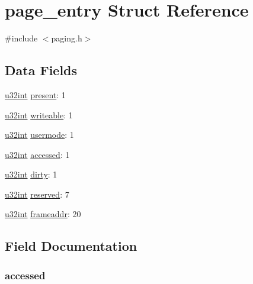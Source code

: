 \hypertarget{structpage__entry}{}\section{page\+\_\+entry Struct Reference}
\label{structpage__entry}


{\ttfamily \#include $<$paging.\+h$>$}

\subsection*{Data Fields}
\begin{DoxyCompactItemize}
\item 
\hyperlink{system_8h_a757de76cafbcddaac0d1632902fe4cb8}{u32int} \hyperlink{structpage__entry_a69718d61bbe7faf204d90744c9824c52}{present}\+: 1
\item 
\hyperlink{system_8h_a757de76cafbcddaac0d1632902fe4cb8}{u32int} \hyperlink{structpage__entry_a421725c39c0745b022f36ab85b6cf3ce}{writeable}\+: 1
\item 
\hyperlink{system_8h_a757de76cafbcddaac0d1632902fe4cb8}{u32int} \hyperlink{structpage__entry_a277f6a1db251178ac4c5bd2e58acf139}{usermode}\+: 1
\item 
\hyperlink{system_8h_a757de76cafbcddaac0d1632902fe4cb8}{u32int} \hyperlink{structpage__entry_afb99a0327fa4c7332208a4c69586c8ec}{accessed}\+: 1
\item 
\hyperlink{system_8h_a757de76cafbcddaac0d1632902fe4cb8}{u32int} \hyperlink{structpage__entry_a3a32ba260115f27563a8197f17c291a6}{dirty}\+: 1
\item 
\hyperlink{system_8h_a757de76cafbcddaac0d1632902fe4cb8}{u32int} \hyperlink{structpage__entry_a428bdea224227681cbba9cb45f3cca62}{reserved}\+: 7
\item 
\hyperlink{system_8h_a757de76cafbcddaac0d1632902fe4cb8}{u32int} \hyperlink{structpage__entry_a95b631ccb680a6af3d4d4a4fda3ca440}{frameaddr}\+: 20
\end{DoxyCompactItemize}


\subsection{Field Documentation}
\hypertarget{structpage__entry_afb99a0327fa4c7332208a4c69586c8ec}{}
\subsubsection[{accessed}]{ accessed}\label{structpage__entry_afb99a0327fa4c7332208a4c69586c8ec}
\hypertarget{structpage__entry_a3a32ba260115f27563a8197f17c291a6}{}
